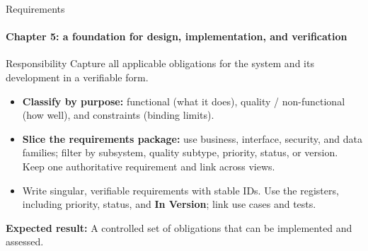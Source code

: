 \begin{frame}{Requirements}
\framesubtitle{Chapter 5: a foundation for design, implementation, and verification}
\begin{block}{Responsibility}
Capture all applicable obligations for the system and its development in a verifiable form.
\end{block}
\begin{itemize}
  \item \textbf{Classify by purpose:} functional (what it does), quality / non-functional (how well), and constraints (binding limits).
  \item \textbf{Slice the requirements package:} use business, interface, security, and data families; filter by subsystem, quality subtype, priority, status, or version. Keep one authoritative requirement and link across views.
  \item Write singular, verifiable requirements with stable IDs. Use the registers, including priority, status, and \textbf{In Version}; link use cases and tests.
\end{itemize}
\vspace{0.1cm}
\textbf{Expected result:} A controlled set of obligations that can be implemented and assessed.
\end{frame}

